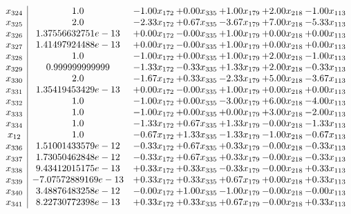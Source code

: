 \documentclass[8pt]{article}
\begin{document}
\[\begin{array}{c| c c@{\hskip 2pt} c@{\hskip 2pt} c@{\hskip 2pt} c@{\hskip 2pt} c@{\hskip 2pt} }
 x_{324}   &  1.0 & -1.00 x_{172} & +  0.00 x_{335} & +  1.00 x_{179} & +  2.00 x_{218} & -1.00 x_{113}\\
 x_{325}   &  2.0 & -2.33 x_{172} & +  0.67 x_{335} & -3.67 x_{179} & +  7.00 x_{218} & -5.33 x_{113}\\
 x_{326}   &  1.37556632751e-13 & +  0.00 x_{172} & -0.00 x_{335} & +  1.00 x_{179} & +  0.00 x_{218} & +  0.00 x_{113}\\
 x_{327}   &  1.41497924488e-13 & +  0.00 x_{172} & -0.00 x_{335} & +  1.00 x_{179} & +  0.00 x_{218} & +  0.00 x_{113}\\
 x_{328}   &  1.0 & -1.00 x_{172} & +  0.00 x_{335} & +  1.00 x_{179} & +  2.00 x_{218} & -1.00 x_{113}\\
 x_{329}   &  0.999999999999 & -1.33 x_{172} & -0.33 x_{335} & +  1.33 x_{179} & +  2.00 x_{218} & -0.33 x_{113}\\
 x_{330}   &  2.0 & -1.67 x_{172} & +  0.33 x_{335} & -2.33 x_{179} & +  5.00 x_{218} & -3.67 x_{113}\\
 x_{331}   &  1.35419453429e-13 & +  0.00 x_{172} & -0.00 x_{335} & +  1.00 x_{179} & +  0.00 x_{218} & +  0.00 x_{113}\\
 x_{332}   &  1.0 & -1.00 x_{172} & +  0.00 x_{335} & -3.00 x_{179} & +  6.00 x_{218} & -4.00 x_{113}\\
 x_{333}   &  1.0 & -1.00 x_{172} & +  0.00 x_{335} & +  0.00 x_{179} & +  3.00 x_{218} & -2.00 x_{113}\\
 x_{334}   &  1.0 & -1.33 x_{172} & +  0.67 x_{335} & +  1.33 x_{179} & -0.00 x_{218} & -1.33 x_{113}\\
 x_{12}   &  1.0 & -0.67 x_{172} & +  1.33 x_{335} & -1.33 x_{179} & -1.00 x_{218} & -0.67 x_{113}\\
 x_{336}   &  1.51001433579e-12 & -0.33 x_{172} & +  0.67 x_{335} & +  0.33 x_{179} & -0.00 x_{218} & -0.33 x_{113}\\
 x_{337}   &  1.73050462848e-12 & -0.33 x_{172} & +  0.67 x_{335} & +  0.33 x_{179} & -0.00 x_{218} & -0.33 x_{113}\\
 x_{338}   &  9.43412015175e-13 & +  0.33 x_{172} & +  0.33 x_{335} & -0.33 x_{179} & -0.00 x_{218} & +  0.33 x_{113}\\
 x_{339}   &  -7.07572889169e-13 & +  0.33 x_{172} & +  0.33 x_{335} & +  0.67 x_{179} & +  0.00 x_{218} & +  0.33 x_{113}\\
 x_{340}   &  3.48876483258e-12 & -0.00 x_{172} & +  1.00 x_{335} & -1.00 x_{179} & -0.00 x_{218} & -0.00 x_{113}\\
 x_{341}   &  8.22730772398e-13 & +  0.33 x_{172} & +  0.33 x_{335} & +  0.67 x_{179} & -0.00 x_{218} & +  0.33 x_{113}\\

\end{array}\]
\end{document}
